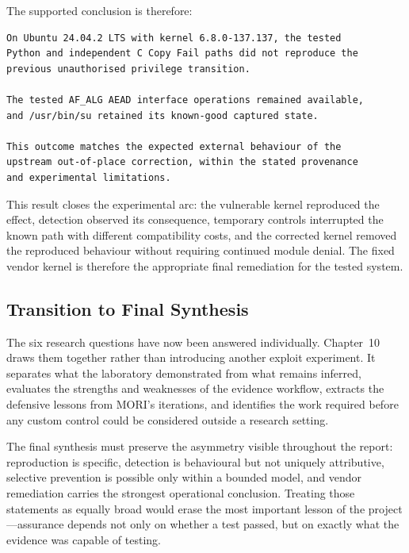 The supported conclusion is therefore:

\begin{lstlisting}
On Ubuntu 24.04.2 LTS with kernel 6.8.0-137.137, the tested
Python and independent C Copy Fail paths did not reproduce the
previous unauthorised privilege transition.

The tested AF_ALG AEAD interface operations remained available,
and /usr/bin/su retained its known-good captured state.

This outcome matches the expected external behaviour of the
upstream out-of-place correction, within the stated provenance
and experimental limitations.
\end{lstlisting}

This result closes the experimental arc: the vulnerable kernel reproduced the
effect, detection observed its consequence, temporary controls interrupted the
known path with different compatibility costs, and the corrected kernel removed
the reproduced behaviour without requiring continued module denial. The fixed
vendor kernel is therefore the appropriate final remediation for the tested
system.

\subsection{Transition to Final Synthesis}

The six research questions have now been answered individually. Chapter~10
draws them together rather than introducing another exploit experiment. It
separates what the laboratory demonstrated from what remains inferred,
evaluates the strengths and weaknesses of the evidence workflow, extracts the
defensive lessons from MORI's iterations, and identifies the work required
before any custom control could be considered outside a research setting.

The final synthesis must preserve the asymmetry visible throughout the report:
reproduction is specific, detection is behavioural but not uniquely
attributive, selective prevention is possible only within a bounded model, and
vendor remediation carries the strongest operational conclusion. Treating
those statements as equally broad would erase the most important lesson of the
project---assurance depends not only on whether a test passed, but on exactly
what the evidence was capable of testing.
